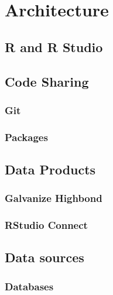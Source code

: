 \documentclass[
]{book}
\begin{document}
\hypertarget{architecture}{%
\chapter{Architecture}\label{architecture}}

\hypertarget{r-and-r-studio}{%
\section{R and R Studio}\label{r-and-r-studio}}

\hypertarget{code-sharing}{%
\section{Code Sharing}\label{code-sharing}}

\hypertarget{git}{%
\subsection{Git}\label{git}}

\hypertarget{packages}{%
\subsection{Packages}\label{packages}}

\hypertarget{data-products}{%
\section{Data Products}\label{data-products}}

\hypertarget{galvanize-highbond}{%
\subsection{Galvanize Highbond}\label{galvanize-highbond}}

\hypertarget{rstudio-connect}{%
\subsection{RStudio Connect}\label{rstudio-connect}}

\hypertarget{data-sources}{%
\section{Data sources}\label{data-sources}}

\hypertarget{databases}{%
\subsection{Databases}\label{databases}}
\end{document}
